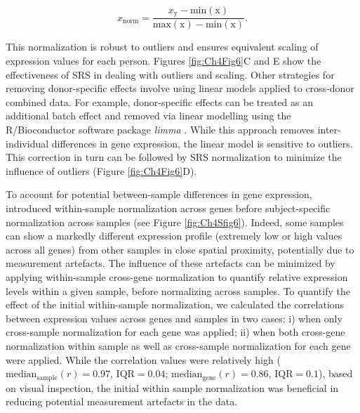 \documentclass[10pt,A4]{article}
\begin{document}
\begin{equation}
    \label{eqn:eq3}
    x_\mathrm{norm} = \frac{x_\mathrm{y}-\mathrm{min(x)}}{\mathrm{max(x)}-\mathrm{min(x)}}.
\end{equation}

This normalization is robust to outliers and ensures equivalent scaling of expression values for each person. Figures \ref{fig:Ch4Fig6}C and E show the effectiveness of SRS in dealing with outliers and scaling. Other strategies for removing donor-specific effects involve using linear models applied to cross-donor combined data. For example, donor-specific effects can be treated as an additional batch effect and removed via linear modelling using the R/Bioconductor software package \textit{limma} \citep{Ritchie2015}. While this approach removes inter-individual differences in gene expression, the linear model is sensitive to outliers. This correction in turn can be followed by SRS normalization to minimize the influence of outliers (Figure \ref{fig:Ch4Fig6}D).

To account for potential between-sample differences in gene expression, \citet{Burt2018} introduced within-sample normalization across genes before subject-specific normalization across samples (see Figure \ref{fig:Ch4Sfig6}). Indeed, some samples can show a markedly different expression profile (extremely low or high values across all genes) from other samples in close spatial proximity, potentially due to measurement artefacts. The influence of these artefacts can be minimized by applying within-sample cross-gene normalization to quantify relative expression levels within a given sample, before normalizing across samples. To quantify the effect of the initial within-sample normalization, we calculated the correlations between expression values across genes and samples in two cases: i) when only cross-sample normalization for each gene was applied; ii) when both cross-gene normalization within sample as well as cross-sample normalization for each gene were applied. While the correlation values were relatively high ($\mathrm{median_\mathrm{sample}}(r) =  0.97$, $\mathrm{IQR} = 0.04$; $\mathrm{median_\mathrm{gene}}(r) = 0.86$, $\mathrm{IQR} = 0.1$), based on visual inspection, the initial within sample normalization was beneficial in reducing potential measurement artefacts in the data.
\end{document}
